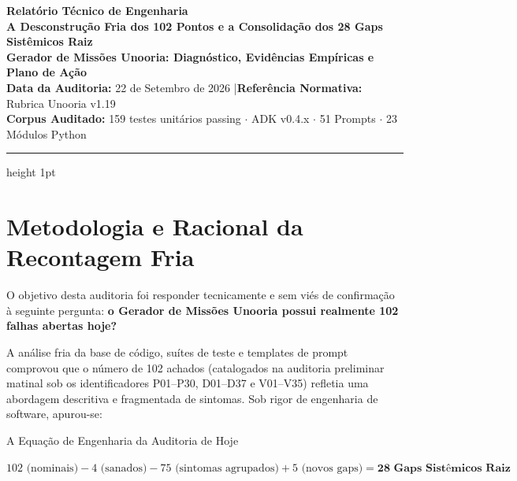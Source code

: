 \documentclass[11pt,a4paper]{article}
\begin{document}
\begin{center}
    {\Huge\bfseries\color{NavyBlue} Relatório Técnico de Engenharia}\\[0.4cm]
    {\LARGE\bfseries\color{SteelBlue} A Desconstrução Fria dos 102 Pontos e a Consolidação dos 28 Gaps Sistêmicos Raiz}\\[0.5cm]
    \textbf{Gerador de Missões Unooria: Diagnóstico, Evidências Empíricas e Plano de Ação}\\[0.3cm]
    {\small \textbf{Data da Auditoria:} 22 de Setembro de 2026 \quad|\quad \textbf{Referência Normativa:} Rubrica Unooria v1.19}\\[0.2cm]
    {\footnotesize \textbf{Corpus Auditado:} 159 testes unitários passing $\cdot$ ADK v0.4.x $\cdot$ 51 Prompts $\cdot$ 23 Módulos Python}
\end{center}

\vspace{0.4cm}
\hrule height 1pt
\vspace{0.5cm}

\section{Metodologia e Racional da Recontagem Fria}

O objetivo desta auditoria foi responder tecnicamente e sem viés de confirmação à seguinte pergunta: \textbf{o Gerador de Missões Unooria possui realmente 102 falhas abertas hoje?}

A análise fria da base de código, suítes de teste e templates de prompt comprovou que o número de 102 achados (catalogados na auditoria preliminar matinal sob os identificadores P01--P30, D01--D37 e V01--V35) refletia uma abordagem descritiva e fragmentada de sintomas. Sob rigor de engenharia de software, apurou-se:

\begin{destaquebox}{A Equação de Engenharia da Auditoria de Hoje}
\begin{center}
\Large
$102 \text{ (nominais)} - 4 \text{ (sanados)} - 75 \text{ (sintomas agrupados)} + 5 \text{ (novos gaps)} = \mathbf{28 \text{ Gaps Sistêmicos Raiz}}$
\end{center}
\end{destaquebox}
\end{document}

